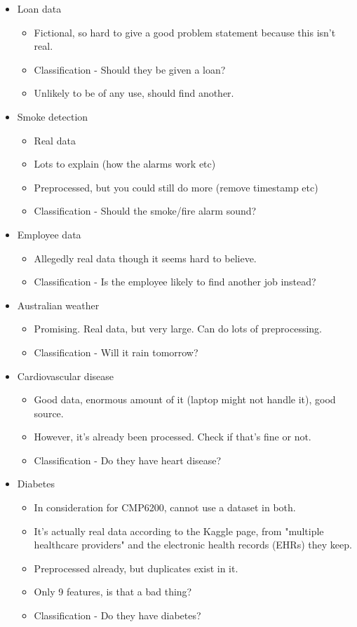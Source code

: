 \documentclass[12pt]{report}
\begin{document}
\begin{itemize}
    \item Loan data \begin{itemize}
        \item Fictional, so hard to give a good problem statement because this isn't real.
        \item Classification - Should they be given a loan?
        \item Unlikely to be of any use, should find another.
    \end{itemize}
    \item Smoke detection \begin{itemize}
        \item Real data
        \item Lots to explain (how the alarms work etc)
        \item Preprocessed, but you could still do more (remove timestamp etc)
        \item Classification - Should the smoke/fire alarm sound?
    \end{itemize}
    \item Employee data \begin{itemize}
        \item Allegedly real data though it seems hard to believe.
        \item Classification - Is the employee likely to find another job instead?
    \end{itemize}
    \item Australian weather \begin{itemize}
        \item Promising. Real data, but very large. Can do lots of preprocessing.
        \item Classification - Will it rain tomorrow?
    \end{itemize}
    \item Cardiovascular disease \begin{itemize}
        \item Good data, enormous amount of it (laptop might not handle it), good source. 
        \item However, it's already been processed. Check if that's fine or not.
        \item Classification - Do they have heart disease?
    \end{itemize}
    \item Diabetes \begin{itemize}
        \item In consideration for CMP6200, cannot use a dataset in both.
        \item It's actually real data according to the Kaggle page, from "multiple healthcare providers" and the 
        electronic health records (EHRs) they keep.
        \item Preprocessed already, but duplicates exist in it.
        \item Only 9 features, is that a bad thing?
        \item Classification - Do they have diabetes?
    \end{itemize}
\end{itemize}
\end{document}
